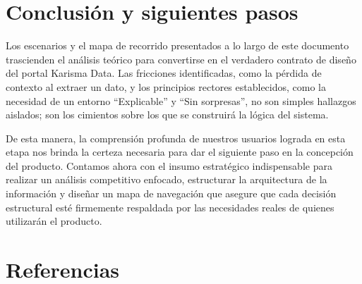 \section{Conclusión y siguientes pasos}

Los escenarios y el mapa de recorrido presentados a lo largo de este documento trascienden el análisis teórico para convertirse en el verdadero contrato de diseño del portal Karisma Data. Las fricciones identificadas, como la pérdida de contexto al extraer un dato, y los principios rectores establecidos, como la necesidad de un entorno ``Explicable'' y ``Sin sorpresas'', no son simples hallazgos aislados; son los cimientos sobre los que se construirá la lógica del sistema.

De esta manera, la comprensión profunda de nuestros usuarios lograda en esta etapa nos brinda la certeza necesaria para dar el siguiente paso en la concepción del producto. Contamos ahora con el insumo estratégico indispensable para realizar un análisis competitivo enfocado, estructurar la arquitectura de la información y diseñar un mapa de navegación que asegure que cada decisión estructural esté firmemente respaldada por las necesidades reales de quienes utilizarán el producto.

\section{Referencias}

